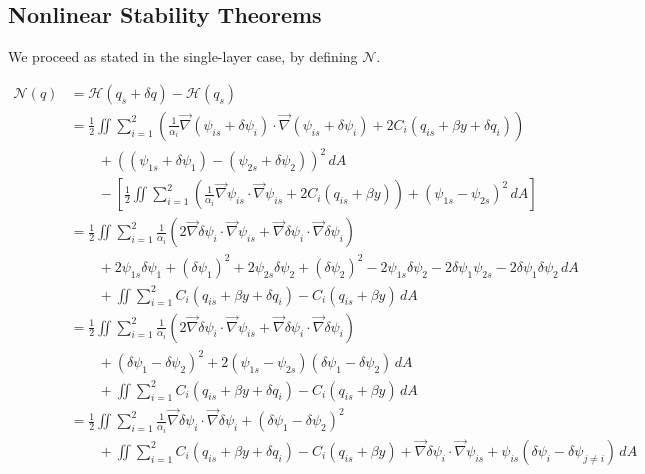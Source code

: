 \documentclass[12pt]{article}
\begin{document}
{    \subsection{Nonlinear Stability Theorems}{
        We proceed as stated in the single-layer case, by defining $\mathcal{N}$.

        \begin{align*}
            \mathcal{N}(q)
            & = \mathcal{H}(q_s + \delta q) - \mathcal{H}(q_s) \\
            &= \frac12 \iint \sum_{i=1}^2 \left( \frac{1}{\alpha_i}\vec\nabla (\psi_{is} + \delta\psi_i) \cdot \vec\nabla (\psi_{is} + \delta\psi_i) + 2C_i(q_{is} + \beta y + \delta q_i) \right) \\
            &\quad\quad + ((\psi_{1s} + \delta\psi_1) - (\psi_{2s} + \delta\psi_2))^2 \, dA \\
            &\quad\quad - \left[ \frac12 \iint \sum_{i=1}^2 \left( \frac{1}{\alpha_i}\vec\nabla \psi_{is} \cdot \vec\nabla \psi_{is} + 2C_i(q_{is} + \beta y) \right) + (\psi_{1s} - \psi_{2s})^2 \, dA \right] \\
            &= \frac12 \iint \sum_{i=1}^2 \frac{1}{\alpha_i} (2 \vec\nabla\delta\psi_i \cdot \vec\nabla\psi_{is} + \vec\nabla\delta\psi_i \cdot \vec\nabla\delta\psi_i) \\
            &\quad\quad + 2\psi_{1s}\delta\psi_1 + (\delta\psi_1)^2 + 2\psi_{2s}\delta\psi_2 + (\delta\psi_2)^2 - 2\psi_{1s}\delta\psi_2 - 2\delta\psi_1\psi_{2s} - 2\delta\psi_1\delta\psi_2 \, dA \\
            &\quad\quad + \iint \sum_{i=1}^2 C_i(q_{is} + \beta y + \delta q_i) - C_i(q_{is} + \beta y) \, dA \\
            &= \frac12 \iint \sum_{i=1}^2 \frac{1}{\alpha_i} (2 \vec\nabla\delta\psi_i \cdot \vec\nabla\psi_{is} + \vec\nabla\delta\psi_i \cdot \vec\nabla\delta\psi_i) \\
            &\quad\quad + (\delta\psi_1 - \delta\psi_2)^2 + 2(\psi_{1s} - \psi_{2s})(\delta\psi_1 - \delta\psi_2) \, dA \\
            &\quad\quad + \iint \sum_{i=1}^2 C_i(q_{is} + \beta y + \delta q_i) - C_i(q_{is} + \beta y) \, dA \\
            &= \frac12 \iint \sum_{i=1}^2 \frac{1}{\alpha_i} \vec\nabla\delta\psi_i \cdot \vec\nabla\delta\psi_i + (\delta\psi_1 - \delta\psi_2)^2 \\
            &\quad\quad + \iint \sum_{i=1}^2 C_i(q_{is} + \beta y + \delta q_i) - C_i(q_{is} + \beta y) + \vec\nabla\delta\psi_i \cdot \vec\nabla\psi_{is} + \psi_{is}(\delta\psi_i - \delta\psi_{j \ne i}) \, dA \\

\end{align*}}}
\end{document}
